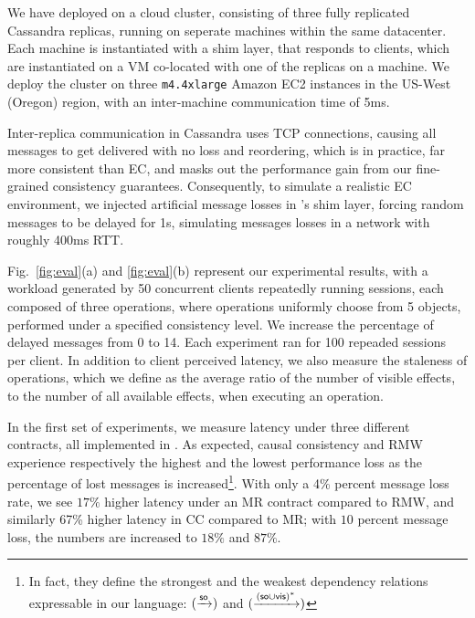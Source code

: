We have deployed \tool on a cloud cluster,
consisting of three fully replicated Cassandra replicas, running on
seperate machines within the same
datacenter. 
Each machine is instantiated with a
\tool shim layer, that responds to clients,  
 which are instantiated on a VM 
co-located with one of the replicas on a machine.
We deploy the cluster on three \texttt{m4.4xlarge} Amazon EC2 instances
in the US-West (Oregon) region, with an inter-machine communication time of 5ms.

Inter-replica communication in Cassandra uses TCP connections,
causing all messages to get delivered with no loss and reordering,
which is in practice, far more consistent than EC, and masks out the
performance gain from our fine-grained consistency guarantees.
Consequently, to simulate a realistic EC environment, 
we injected artificial message losses in
\tool's shim layer, forcing random messages to be delayed for 1s,
simulating messages losses in a network with roughly 400ms RTT.


Fig.~\ref{fig:eval}(a) and \ref{fig:eval}(b) represent
our experimental results, with a workload generated 
by 50 concurrent clients repeatedly running sessions, each composed of three
operations, where operations uniformly choose from 5 objects,
performed under a specified consistency level. 
We increase the
percentage of delayed messages from 0 to 14.  Each experiment ran for
100 repeaded sessions per client. In addition to client perceived
latency, we also measure the staleness of operations, which we define as
the average ratio of the number of visible effects,
to the number of all available effects, when executing an operation.

In the first set of experiments, we measure latency under
three different \LB{} contracts, all implemented in \tool. As
expected,
causal consistency and RMW experience respectively the highest and the
lowest
performance loss as the percentage of lost messages is increased\footnote{In fact, 
they define the strongest and the weakest
\LB{} dependency relations expressable in our language:
$(\xrightarrow{{\textsf{so}}})$ and $(\xrightarrow{({\textsf{so}}\cup{\normalfont \textsf{vis}})^*})$}.
With only a 4\% percent message loss rate, we see $17\%$ higher latency under an MR
contract compared to RMW, and similarly 67\% higher latency in CC
compared to MR; with $10$ percent message loss, the numbers are
increased to $18\%$ and $87\%$.


